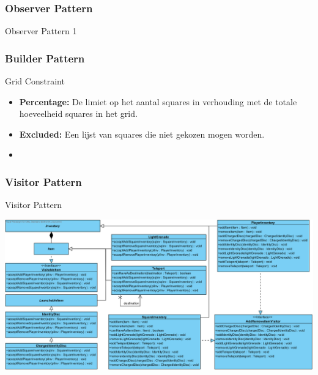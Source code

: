 \documentclass[t]{beamer}
\begin{document}
\subsubsection{Observer Pattern}
\begin{frame}{Observer Pattern 1}
\begin{center}

\end{center}
\end{frame}

\subsubsection{Builder Pattern}
\begin{frame}
\begin{center}

\end{center}
\end{frame}
\begin{frame}{Grid Constraint}
\begin{itemize}
	\item \textbf{Percentage:} De limiet op het aantal squares in verhouding met de totale hoeveelheid squares in het grid.
	\item \textbf{Excluded:} Een lijst van squares die niet gekozen mogen worden.
	\item 
\end{itemize}
\end{frame}

\subsubsection{Visitor Pattern}
\begin{frame}{Visitor Pattern}
\begin{center}
\includegraphics[width=1\linewidth]{images/VisitorUML}
\end{center}
\end{frame}
\end{document}
